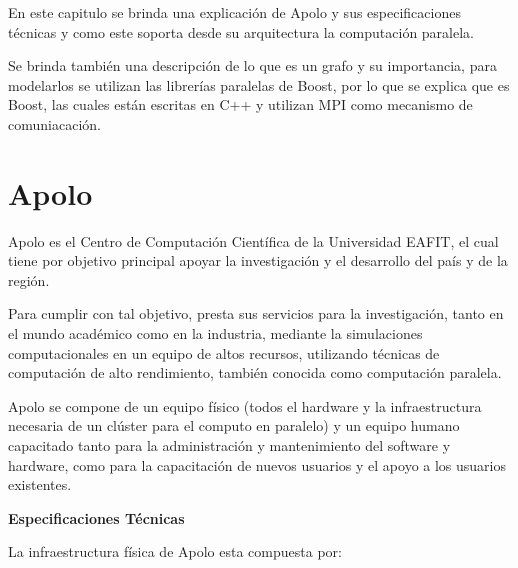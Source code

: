En este capitulo se brinda una explicación de Apolo y sus especificaciones técnicas y como este soporta desde su arquitectura la computación paralela. 

Se brinda también una  descripción de lo que es un grafo y su importancia, para modelarlos se utilizan las librerías paralelas de Boost, por lo que se explica que es Boost, las cuales están escritas en C++ y utilizan MPI como mecanismo de comuniacación.


\section{Apolo}

Apolo es el Centro de Computación Científica de la Universidad EAFIT, el cual tiene por objetivo principal apoyar la investigación y el desarrollo del país y de la región. 

Para cumplir con tal objetivo, presta sus servicios para la investigación, tanto en el mundo académico como en la industria, mediante la simulaciones computacionales en un equipo de altos recursos, utilizando técnicas de computación de alto rendimiento, también conocida como computación paralela.

Apolo se compone de un equipo físico (todos el hardware y la infraestructura necesaria de un clúster para el computo en paralelo) y un equipo humano capacitado tanto para la administración y mantenimiento del software y hardware, como  para la capacitación de nuevos usuarios y el apoyo a los usuarios existentes.

\textbf{Especificaciones Técnicas} 

La infraestructura física de Apolo esta compuesta por:

